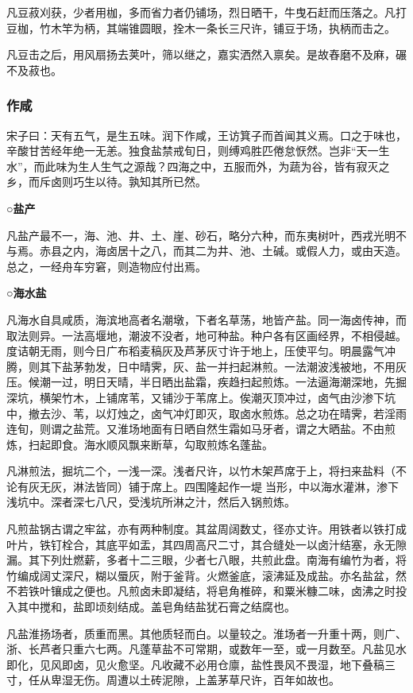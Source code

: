 \documentclass[]{article}
\begin{document}
凡豆菽刈获，少者用枷，多而省力者仍铺场，烈日晒干，牛曳石赶而压落之。凡打豆枷，竹木竿为柄，其端锥圆眼，拴木一条长三尺许，铺豆于场，执柄而击之。

凡豆击之后，用风扇扬去荚叶，筛以继之，嘉实洒然入禀矣。是故舂磨不及麻，碾不及菽也。

\hypertarget{header-n2396}{%
\subsubsection{作咸}\label{header-n2396}}

宋子曰：天有五气，是生五味。润下作咸，王访箕子而首闻其义焉。口之于味也，辛酸甘苦经年绝一无恙。独食盐禁戒旬日，则缚鸡胜匹倦怠恹然。岂非``天一生水''，而此味为生人生气之源哉？四海之中，五服而外，为蔬为谷，皆有寂灭之乡，而斥卤则巧生以待。孰知其所已然。

\textbf{○盐产}

凡盐产最不一，海、池、井、土、崖、砂石，略分六种，而东夷树叶，西戎光明不与焉。赤县之内，海卤居十之八，而其二为井、池、土碱。或假人力，或由天造。总之，一经舟车穷窘，则造物应付出焉。

\textbf{○海水盐}

凡海水自具咸质，海滨地高者名潮墩，下者名草荡，地皆产盐。同一海卤传神，而取法则异。一法高堰地，潮波不没者，地可种盐。种户各有区画经界，不相侵越。度诘朝无雨，则今日广布稻麦稿灰及芦茅灰寸许于地上，压使平匀。明晨露气冲腾，则其下盐茅勃发，日中晴霁，灰、盐一并扫起淋煎。一法潮波浅被地，不用灰压。候潮一过，明日天晴，半日晒出盐霜，疾趋扫起煎炼。一法逼海潮深地，先掘深坑，横架竹木，上铺席苇，又铺沙于苇席上。俟潮灭顶冲过，卤气由沙渗下坑中，撤去沙、苇，以灯烛之，卤气冲灯即灭，取卤水煎炼。总之功在晴霁，若淫雨连旬，则谓之盐荒。又淮场地面有日晒自然生霜如马牙者，谓之大晒盐。不由煎炼，扫起即食。海水顺风飘来断草，勾取煎炼名蓬盐。

凡淋煎法，掘坑二个，一浅一深。浅者尺许，以竹木架芦席于上，将扫来盐料（不论有灰无灰，淋法皆同）铺于席上。四围隆起作一堤当形，中以海水灌淋，渗下浅坑中。深者深七八尺，受浅坑所淋之汁，然后入锅煎炼。

凡煎盐锅古谓之牢盆，亦有两种制度。其盆周阔数丈，径亦丈许。用铁者以铁打成叶片，铁钉栓合，其底平如盂，其四周高尺二寸，其合缝处一以卤汁结塞，永无隙漏。其下列灶燃薪，多者十二三眼，少者七八眼，共煎此盘。南海有编竹为者，将竹编成阔丈深尺，糊以蜃灰，附于釜背。火燃釜底，滚沸延及成盐。亦名盐盆，然不若铁叶镶成之便也。凡煎卤未即凝结，将皂角椎碎，和粟米糠二味，卤沸之时投入其中搅和，盐即顷刻结成。盖皂角结盐犹石膏之结腐也。

凡盐淮扬场者，质重而黑。其他质轻而白。以量较之。淮场者一升重十两，则广、浙、长芦者只重六七两。凡蓬草盐不可常期，或数年一至，或一月数至。凡盐见水即化，见风即卤，见火愈坚。凡收藏不必用仓廪，盐性畏风不畏湿，地下叠稿三寸，任从卑湿无伤。周遭以土砖泥隙，上盖茅草尺许，百年如故也。
\end{document}
